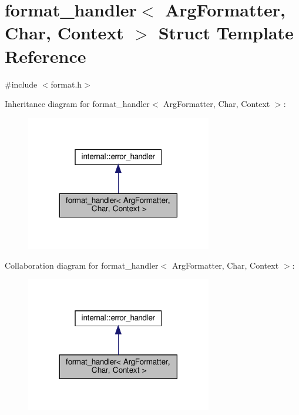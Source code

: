 \hypertarget{structformat__handler}{}\section{format\+\_\+handler$<$ Arg\+Formatter, Char, Context $>$ Struct Template Reference}
\label{structformat__handler}


{\ttfamily \#include $<$format.\+h$>$}



Inheritance diagram for format\+\_\+handler$<$ Arg\+Formatter, Char, Context $>$\+:
\nopagebreak
\begin{figure}[H]
\begin{center}
\leavevmode
\includegraphics[width=230pt]{structformat__handler__inherit__graph}
\end{center}
\end{figure}


Collaboration diagram for format\+\_\+handler$<$ Arg\+Formatter, Char, Context $>$\+:
\nopagebreak
\begin{figure}[H]
\begin{center}
\leavevmode
\includegraphics[width=230pt]{structformat__handler__coll__graph}
\end{center}
\end{figure}

